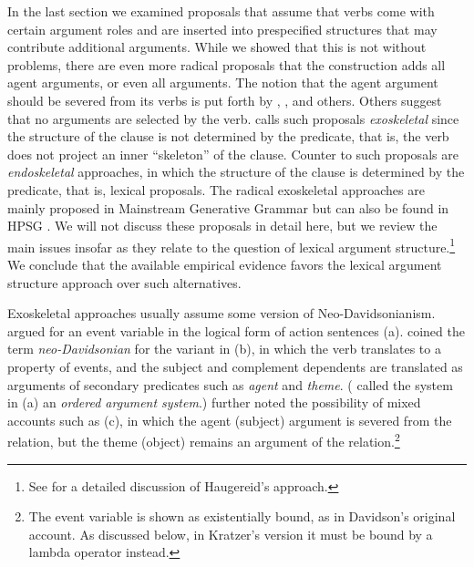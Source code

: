 In the last section we examined proposals that assume that verbs come with certain argument roles
and are inserted into prespecified structures that may contribute additional arguments. While we
showed that this is not without problems, there are even more radical proposals that the
construction adds all agent arguments, or even all arguments.  The notion that the agent argument
should be severed from its verbs is put forth by \citet{Marantz84a, Marantz97a}, \citet{Kratzer96a},
\citet{Embick2004a} and others.  Others suggest that no arguments are selected by the verb.
\citet{Borer2003a-u} calls such proposals \emph{exoskeletal} since the structure of the clause is
not determined by the predicate, that is, the verb does not project an inner ``skeleton'' of the
clause.  Counter to such proposals are \emph{endoskeletal} approaches, in which the structure of the
clause is determined by the predicate, that is, lexical proposals.  The radical exoskeletal
approaches are mainly proposed in Mainstream Generative Grammar
\citep{Borer94a-u,Borer2003a-u,Borer2005a-u,Schein93a-u,HK97a-u,Lohndal2012a} but can also be found
in HPSG \citep{Haugereid2009a}.  We will not discuss these proposals in detail here, but we review
the main issues insofar as they relate to the question of lexical argument structure.\footnote{
  See  for a detailed discussion of Haugereid's approach.%
} We conclude that the available empirical evidence favors the lexical argument structure approach over such
alternatives.

Exoskeletal approaches usually assume some version of Neo-Davidsonianism. \citet{Davidson67a-u}
argued for an event variable in the logical form of action sentences (a).
\citet{Dowty89b-u} coined the term \emph{neo-Davidsonian} for the variant in (b), in which
the verb translates to a property of events, and the subject and complement dependents are
translated as arguments of secondary predicates such as \emph{agent} and
\emph{theme}. (\citet{Dowty89b-u} called the system in (a) an \emph{ordered argument
  system}.) \citet{Kratzer96a} further noted the possibility of mixed accounts such as (c),
in which the agent (subject) argument is severed from the  relation, but the theme (object) remains an
argument of the  relation.\footnote{%
  The event variable is shown as existentially bound, as in Davidson's original account.  
  As discussed below, in Kratzer's version it must be bound by a lambda operator instead.} 

